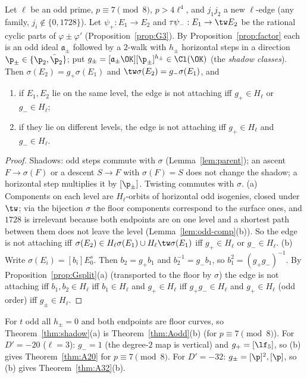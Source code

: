 \begin{theorem}\label{thm:shadow}
Let $\ell$ be an odd prime, $p\equiv7\pmod8$, $p>4\ell^4$, and $j_1j_2$ a new $\ell$-edge (any family, $j_i\notin\{0,1728\}$).  Let $\psi_+:E_1\to E_2$
and $\tau\psi_-:E_1\to\tw E_2$ be the rational cyclic parts of $\varphi\pm\varphi'$ (Proposition~\ref{prop:G3}).  By
Proposition~\ref{prop:factor} each is an odd ideal $\mathfrak a_\pm$ followed by a $2$-walk with $h_\pm$ horizontal steps in a direction
$\p_\pm\in\{\p_2,\bar\p_2\}$; put $g_\pm=[\mathfrak a_\pm\OK][\p_\pm]^{h_\pm}\in\Cl(\OK)$ (the \emph{shadow classes}).  Then
$\sigma(E_2)=g_+\sigma(E_1)$ and $\tw\sigma(E_2)=g_-\sigma(E_1)$, and
\begin{enumerate}[label=(\alph*)]
\item if $E_1,E_2$ lie on the same level, the edge is not attaching iff $g_+\in H_\ell$ or $g_-\in H_\ell$;
\item if they lie on different levels, the edge is not attaching iff $g_+\in H_\ell$ and $g_-\in H_\ell$.
\end{enumerate}
\end{theorem}
\begin{proof}
Shadows: odd steps commute with $\sigma$ (Lemma~\ref{lem:parent}); an ascent $F\to\sigma(F)$ or a descent $S\to F$ with $\sigma(F)=S$ does not change the
shadow; a horizontal step multiplies it by $[\p_\pm]$.  Twisting commutes with $\sigma$.  (a) Components on each level are $H_\ell$-orbits of
horizontal odd isogenies, closed under $\tw$; via the bijection $\sigma$ the floor components correspond to the surface ones, and $1728$ is irrelevant
because both endpoints are on one level and a shortest path between them does not leave the level (Lemma~\ref{lem:odd-comp}(b)).  So the edge is not
attaching iff $\sigma(E_2)\in H_\ell\sigma(E_1)\cup H_\ell\tw\sigma(E_1)$ iff $g_+\in H_\ell$ or $g_-\in H_\ell$.  (b) Write $\sigma(E_i)=[b_i]E_0^s$.  Then
$b_2=g_+b_1$ and $b_2^{-1}=g_-b_1$, so $b_1^2=(g_+g_-)^{-1}$.  By Proposition~\ref{prop:Gsplit}(a) (transported to the floor by $\sigma$) the edge is not
attaching iff $b_1,b_2\in H_\ell$ iff $b_1\in H_\ell$ and $g_+\in H_\ell$ iff $g_+g_-\in H_\ell$ and $g_+\in H_\ell$ (odd order) iff $g_\pm\in H_\ell$.
\end{proof}

\begin{remark}
For $t$ odd all $h_\pm=0$ and both endpoints are floor curves, so Theorem~\ref{thm:shadow}(a) is Theorem~\ref{thm:Aodd}(b) (for $p\equiv7\pmod8$).  For
$D'=-20$ ($\ell=3$): $g_-=1$ (the degree-$2$ map is vertical) and $g_+=[\lf_5]$, so (b) gives Theorem~\ref{thm:A20} for $p\equiv7\pmod8$.  For
$D'=-32$: $g_\pm=[\p]^{2},[\p]$, so (b) gives Theorem~\ref{thm:A32}(b).
\end{remark}
